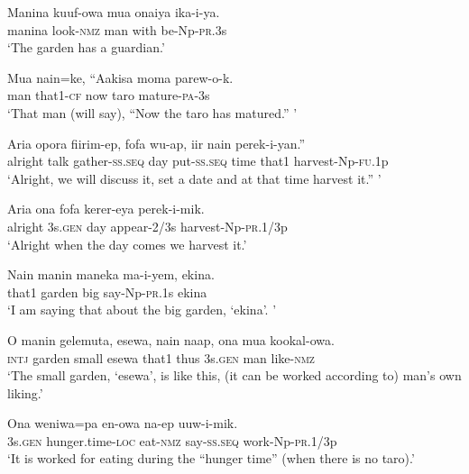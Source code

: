 \ea\label{ex:a:x24}
\gll  Manina  kuuf-owa  mua  onaiya  ika-i-ya. \\
manina  look-\textsc{nmz}  man  with  be-Np-\textsc{pr}.3s \\
\glt ‘The garden has a guardian.’ \\
\z


\ea\label{ex:a:x25}
\gll  Mua  nain=ke,  “Aakisa  moma  parew-o-k. \\
man  that1-\textsc{cf}  now  taro  mature-\textsc{pa}-3s \\
\glt ‘That man (will say), “Now the taro has matured.” ’ \\
\z


\ea\label{ex:a:x26}
\gll  Aria  opora  fiirim-ep,  fofa  wu-ap,  iir  nain  perek-i-yan.” \\
alright  talk  gather-\textsc{ss.seq}  day  put-\textsc{ss.seq}  time  that1  harvest-Np-\textsc{fu}.1p \\
\glt ‘Alright, we will discuss it, set a date and at that time harvest it.” ’ \\
\z


\ea\label{ex:a:x27}
\gll  Aria  ona  fofa  kerer-eya  perek-i-mik. \\
alright  3s.\textsc{gen}  day  appear-2/3s  harvest-Np-\textsc{pr}.1/3p \\
\glt ‘Alright when the day comes we harvest it.’ \\
\z


\ea\label{ex:a:x28}
\gll  Nain  manin  maneka  ma-i-yem,  ekina. \\
that1  garden  big  say-Np-\textsc{pr}.1s  ekina \\
\glt ‘I am saying that about the big garden, ‘ekina’. ’ \\
\z


\ea\label{ex:a:x29}
\gll  O  manin  gelemuta,  esewa,  nain  naap,  ona  mua  kookal-owa. \\
\textsc{intj}  garden  small  esewa  that1  thus  3s.\textsc{gen}  man  like-\textsc{nmz} \\
\glt ‘The small garden, ‘esewa’, is like this, (it can be worked according to) man’s own liking.’ \\
\z


\ea\label{ex:a:x30}
\gll  Ona  weniwa=pa  en-owa  na-ep  uuw-i-mik. \\
3s.\textsc{gen}  hunger.time-\textsc{loc}  eat-\textsc{nmz}  say-\textsc{ss.seq}  work-Np-\textsc{pr}.1/3p \\
\glt ‘It is worked for eating during the “hunger time” (when there is no taro).’ \\
\z


